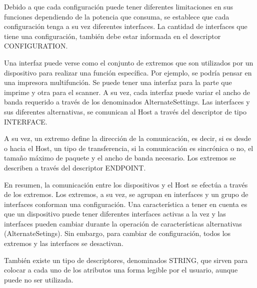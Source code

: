 Debido a que cada configuración puede tener diferentes limitaciones en sus funciones dependiendo de la potencia que consuma, se establece que cada configuración tenga a su vez diferentes interfaces. La cantidad de interfaces que tiene una configuración, también debe estar informada en el descriptor CONFIGURATION.%

Una interfaz puede verse como el conjunto de extremos que son utilizados por un dispositivo para realizar una función específica. Por ejemplo, se podría pensar en una impresora multifunción. Se puede tener una interfaz para la parte que imprime y otra para el scanner. A su vez, cada interfaz puede variar el ancho de banda requerido a través de los denominados AlternateSettings. Las interfaces y sus diferentes alternativas, se comunican al Host a través del descriptor de tipo INTERFACE.%

A su vez, un extremo define la dirección de la comunicación, es decir, si es desde o hacia el Host, un tipo de transferencia, si la comunicación es sincrónica o no, el tamaño máximo de paquete y el ancho de banda necesario. Los extremos se describen a través del descriptor ENDPOINT.%

En resumen, la comunicación entre los dispositivos y el Host se efectúa a través de los extremos. Los extremos, a su vez, se agrupan en interfaces y un grupo de interfaces conforman una configuración. Una característica a tener en cuenta es que un dispositivo puede tener diferentes interfaces activas a la vez y las interfaces pueden cambiar durante la operación de características alternativas (AlternateSetings). Sin embargo, para cambiar de configuración, todos los extremos y las interfaces se desactivan.%

También existe un tipo de descriptores, denominados STRING, que sirven para colocar a cada uno de los atributos una forma legible por el usuario, aunque puede no ser utilizada. 


